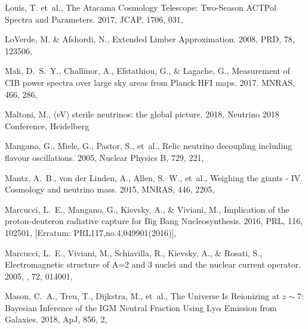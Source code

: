 \documentclass[longauth,traditabstract]{aa}
\def\apj{{ApJ}}
\def\mnras{{MNRAS}}
\def\prd{{PRD}}
\def\prl{{PRL}}
\def\jcap{{JCAP}}
\begin{document}
\begin{thebibliography}{379}
Louis, T. {et~al.}, {The Atacama Cosmology Telescope: Two-Season ACTPol Spectra
  and Parameters}. 2017, \jcap, 1706, 031, 

LoVerde, M. \& Afshordi, N., {Extended Limber Approximation}. 2008, \prd, 78,
  123506, 

{Mak}, D.~S.~Y., {Challinor}, A., {Efstathiou}, G., \& {Lagache}, G.,
  {Measurement of CIB power spectra over large sky areas from Planck HFI maps}.
  2017, \mnras, 466, 286, 

{Maltoni}, M., {(eV) sterile neutrinos: the global picture}. 2018, Neutrino
  2018 Conference, Heidelberg

{Mangano}, G., {Miele}, G., {Pastor}, S., {et~al.}, {Relic neutrino decoupling
  including flavour oscillations}. 2005, Nuclear Physics B, 729, 221,

{Mantz}, A.~B., {von der Linden}, A., {Allen}, S.~W., {et~al.}, {Weighing the
  giants - IV. Cosmology and neutrino mass}. 2015, \mnras, 446, 2205,

Marcucci, L.~E., Mangano, G., Kievsky, A., \& Viviani, M., {Implication of the
  proton-deuteron radiative capture for Big Bang Nucleosynthesis}. 2016, \prl,
  116, 102501, [Erratum: PRL117,no.4,049901(2016)], 

Marcucci, L.~E., Viviani, M., Schiavilla, R., Kievsky, A., \& Rosati, S.,
  {Electromagnetic structure of A=2 and 3 nuclei and the nuclear current
  operator}. 2005, \prc, 72, 014001, 

Mason, C.~A., Treu, T., Dijkstra, M., {et~al.}, {The Universe Is Reionizing at
  $z \sim 7$: Bayesian Inference of the IGM Neutral Fraction Using Ly$\alpha$
  Emission from Galaxies}. 2018, \apj, 856, 2, 


\end{thebibliography}
\end{document}
